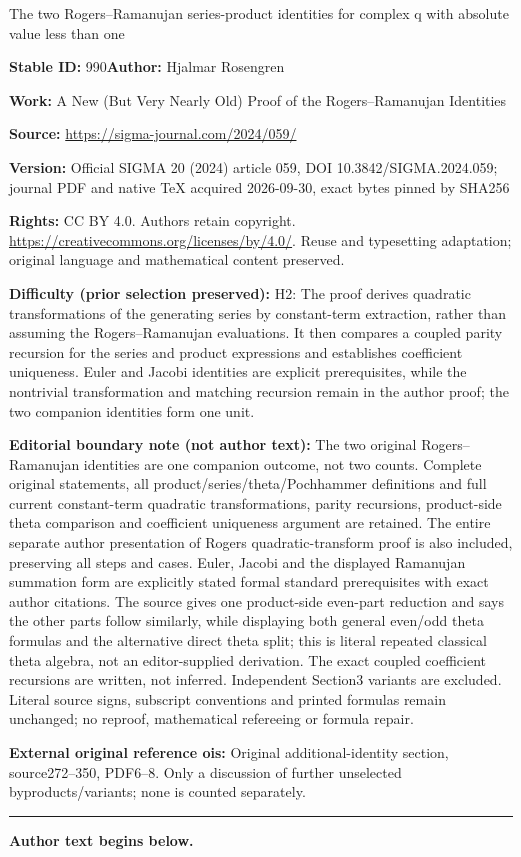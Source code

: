 \documentclass[11pt]{article}
\numberwithin{equation}{section}
\numberwithin{equation}{section}
\begin{document}
\begin{center}\Large The two Rogers–Ramanujan series-product identities for complex q with absolute value less than one\end{center}
\noindent\textbf{Stable ID:} 990\quad\textbf{Author:} Hjalmar Rosengren\par
\noindent\textbf{Work:} A New (But Very Nearly Old) Proof of the Rogers–Ramanujan Identities\par
\noindent\textbf{Source:} \url{https://sigma-journal.com/2024/059/}\par
\noindent\textbf{Version:} Official SIGMA 20 (2024) article 059, DOI 10.3842/SIGMA.2024.059; journal PDF and native TeX acquired 2026-09-30, exact bytes pinned by SHA256\par
\noindent\textbf{Rights:} CC BY 4.0. Authors retain copyright. \url{https://creativecommons.org/licenses/by/4.0/}. Reuse and typesetting adaptation; original language and mathematical content preserved.\par
\noindent\textbf{Difficulty (prior selection preserved):} {\CJKfont H2: The proof derives quadratic transformations of the generating series by constant-term extraction, rather than assuming the Rogers–Ramanujan evaluations. It then compares a coupled parity recursion for the series and product expressions and establishes coefficient uniqueness. Euler and Jacobi identities are explicit prerequisites, while the nontrivial transformation and matching recursion remain in the author proof; the two companion identities form one unit.}\par
\medskip\noindent\textbf{Editorial boundary note (not author text):} The two original Rogers–Ramanujan identities are one companion outcome, not two counts. Complete original statements, all product/series/theta/Pochhammer definitions and full current constant-term quadratic transformations, parity recursions, product-side theta comparison and coefficient uniqueness argument are retained. The entire separate author presentation of Rogers quadratic-transform proof is also included, preserving all steps and cases. Euler, Jacobi and the displayed Ramanujan summation form are explicitly stated formal standard prerequisites with exact author citations. The source gives one product-side even-part reduction and says the other parts follow similarly, while displaying both general even/odd theta formulas and the alternative direct theta split; this is literal repeated classical theta algebra, not an editor-supplied derivation. The exact coupled coefficient recursions are written, not inferred. Independent Section3 variants are excluded. Literal source signs, subscript conventions and printed formulas remain unchanged; no reproof, mathematical refereeing or formula repair.\par
\noindent\textbf{External original reference ois:} Original additional-identity section, source272–350, PDF6–8. Only a discussion of further unselected byproducts/variants; none is counted separately.\par
\medskip\hrule\medskip\noindent\textbf{Author text begins below.}\par
\end{document}
